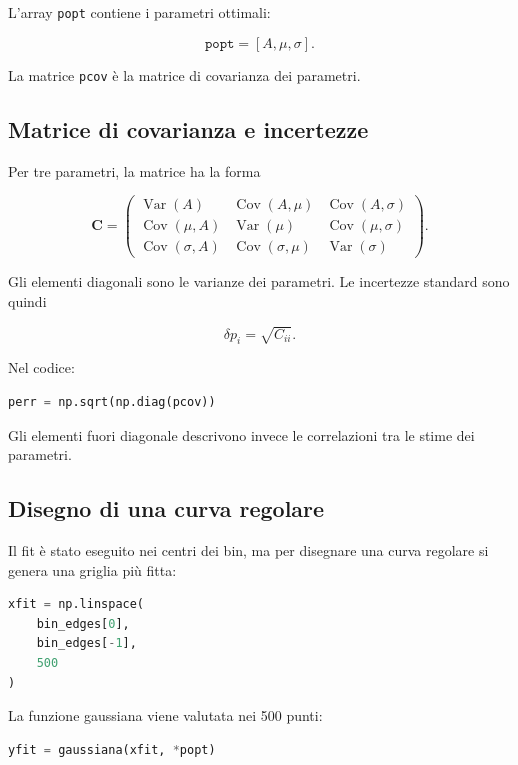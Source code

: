 \documentclass[11pt,a4paper]{book}
\begin{document}
L'array \texttt{popt} contiene i parametri ottimali:

\[
\texttt{popt}=[A,\mu,\sigma].
\]

La matrice \texttt{pcov} è la matrice di covarianza dei parametri.

\subsection{Matrice di covarianza e incertezze}

Per tre parametri, la matrice ha la forma

\[
\mathbf{C}=
\begin{pmatrix}
\operatorname{Var}(A) & \operatorname{Cov}(A,\mu) &
\operatorname{Cov}(A,\sigma)\\
\operatorname{Cov}(\mu,A) & \operatorname{Var}(\mu) &
\operatorname{Cov}(\mu,\sigma)\\
\operatorname{Cov}(\sigma,A) & \operatorname{Cov}(\sigma,\mu) &
\operatorname{Var}(\sigma)
\end{pmatrix}.
\]

Gli elementi diagonali sono le varianze dei parametri. Le incertezze
standard sono quindi

\[
\delta p_i=\sqrt{C_{ii}}.
\]

Nel codice:

\begin{lstlisting}[language=Python]
perr = np.sqrt(np.diag(pcov))
\end{lstlisting}

Gli elementi fuori diagonale descrivono invece le correlazioni tra le
stime dei parametri.

\subsection{Disegno di una curva regolare}

Il fit è stato eseguito nei centri dei bin, ma per disegnare una curva
regolare si genera una griglia più fitta:

\begin{lstlisting}[language=Python]
xfit = np.linspace(
    bin_edges[0],
    bin_edges[-1],
    500
)
\end{lstlisting}

La funzione gaussiana viene valutata nei 500 punti:

\begin{lstlisting}[language=Python]
yfit = gaussiana(xfit, *popt)
\end{lstlisting}
\end{document}

